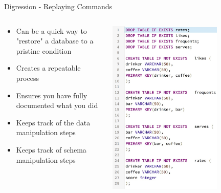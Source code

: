 \documentclass[aspectratio=169]{beamer}
\begin{document}
\begin{frame}{Digression - Replaying Commands}

\begin{columns}[T]
\begin{column}{0.5\textwidth}
\begin{itemize}
\item Can be a quick way to "restore" a database to a pristine condition
\item Creates a repeatable process 
\item Ensures you have fully documented what you did
\item Keeps track of the data manipulation steps
\item Keeps track of schema manipulation steps
\end{itemize}
\end{column}
\begin{column}{0.5\textwidth}
{\centering\includegraphics[width=0.7\textwidth]{./lectDDL/replay.jpg}\par}
\end{column}
\end{columns}

\end{frame}
\end{document}
